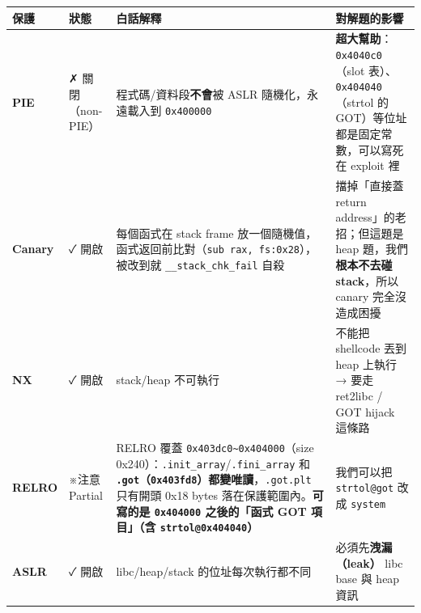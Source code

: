 \documentclass[10pt,a4paper]{article}
\newcounter{none}
\begin{document}
{\def\LTcaptype{none} %
\begin{longtable}[]{@{}
  >{\raggedright\arraybackslash}p{}
  >{\raggedright\arraybackslash}p{}
  >{\raggedright\arraybackslash}p{}
  >{\raggedright\arraybackslash}p{}@{}}
\toprule\noalign{}
\begin{minipage}[b]{\linewidth}\raggedright
保護
\end{minipage} & \begin{minipage}[b]{\linewidth}\raggedright
狀態
\end{minipage} & \begin{minipage}[b]{\linewidth}\raggedright
白話解釋
\end{minipage} & \begin{minipage}[b]{\linewidth}\raggedright
對解題的影響
\end{minipage} \\
\midrule\noalign{}
\endhead
\bottomrule\noalign{}
\endlastfoot
\textbf{PIE} & ✗ 關閉（non-PIE） & 程式碼/資料段\textbf{不會}被 ASLR
隨機化，永遠載入到 \texttt{0x400000} &
\textbf{超大幫助}：\texttt{0x4040c0}（slot
表）、\texttt{0x404040}（strtol 的 GOT）等位址都是固定常數，可以寫死在
exploit 裡 \\
\textbf{Canary} & ✓ 開啟 & 每個函式在 stack frame
放一個隨機值，函式返回前比對（\texttt{sub\ \allowbreak{}rax,\allowbreak{}\ \allowbreak{}fs:\allowbreak{}0x28}），被改到就
\texttt{\_\allowbreak{}\_\allowbreak{}stack\_\allowbreak{}chk\_\allowbreak{}fail} 自殺 & 擋掉「直接蓋 return
address」的老招；但這題是 heap 題，我們\textbf{根本不去碰 stack}，所以
canary 完全沒造成困擾 \\
\textbf{NX} & ✓ 開啟 & stack/heap 不可執行 & 不能把 shellcode 丟到 heap
上執行 → 要走 ret2libc / GOT hijack 這條路 \\
\textbf{RELRO} & ※注意 Partial & RELRO 覆蓋
\texttt{0x403dc0\textasciitilde{}\allowbreak{}0x404000}（size
0x240）：\texttt{.\allowbreak{}init\_\allowbreak{}array}/\texttt{.\allowbreak{}fini\_\allowbreak{}array} 和
\textbf{\texttt{.\allowbreak{}got}（\texttt{0x403fd8}）都變唯讀}，\texttt{.\allowbreak{}got.\allowbreak{}plt}
只有開頭 0x18 bytes 落在保護範圍內。\textbf{可寫的是 \texttt{0x404000}
之後的「函式 GOT 項目」（含 \texttt{strtol@0x404040}）} & 我們可以把
\texttt{strtol@got} 改成 \texttt{system} \\
\textbf{ASLR} & ✓ 開啟 & libc/heap/stack 的位址每次執行都不同 &
必須先\textbf{洩漏（leak）} libc base 與 heap 資訊 \\
\end{longtable}
}
\end{document}
